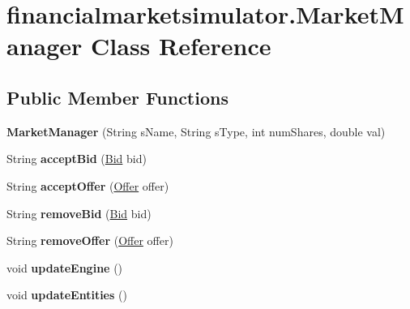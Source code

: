 \hypertarget{classfinancialmarketsimulator_1_1_market_manager}{\section{financialmarketsimulator.\+Market\+Manager Class Reference}
\label{classfinancialmarketsimulator_1_1_market_manager}
}
\subsection*{Public Member Functions}
\begin{DoxyCompactItemize}
\item 
\hypertarget{classfinancialmarketsimulator_1_1_market_manager_abec3bfc62ba95bd12c444492b7cad61e}{{\bfseries Market\+Manager} (String s\+Name, String s\+Type, int num\+Shares, double val)}\label{classfinancialmarketsimulator_1_1_market_manager_abec3bfc62ba95bd12c444492b7cad61e}

\item 
\hypertarget{classfinancialmarketsimulator_1_1_market_manager_a468b11be3b1e2ce72f93dfc25468273b}{String {\bfseries accept\+Bid} (\hyperlink{classfinancialmarketsimulator_1_1_bid}{Bid} bid)}\label{classfinancialmarketsimulator_1_1_market_manager_a468b11be3b1e2ce72f93dfc25468273b}

\item 
\hypertarget{classfinancialmarketsimulator_1_1_market_manager_a2f9ad41c35ca0bb1ad2ac045f8cd3dd3}{String {\bfseries accept\+Offer} (\hyperlink{classfinancialmarketsimulator_1_1_offer}{Offer} offer)}\label{classfinancialmarketsimulator_1_1_market_manager_a2f9ad41c35ca0bb1ad2ac045f8cd3dd3}

\item 
\hypertarget{classfinancialmarketsimulator_1_1_market_manager_aa8c0454b1d66599ff5abbb01d35790e8}{String {\bfseries remove\+Bid} (\hyperlink{classfinancialmarketsimulator_1_1_bid}{Bid} bid)}\label{classfinancialmarketsimulator_1_1_market_manager_aa8c0454b1d66599ff5abbb01d35790e8}

\item 
\hypertarget{classfinancialmarketsimulator_1_1_market_manager_ad49a43c96b962562014c7bb37dfa5f7e}{String {\bfseries remove\+Offer} (\hyperlink{classfinancialmarketsimulator_1_1_offer}{Offer} offer)}\label{classfinancialmarketsimulator_1_1_market_manager_ad49a43c96b962562014c7bb37dfa5f7e}

\item 
\hypertarget{classfinancialmarketsimulator_1_1_market_manager_afb2bf557ed70cd23feccddfb5c01ab0d}{void {\bfseries update\+Engine} ()}\label{classfinancialmarketsimulator_1_1_market_manager_afb2bf557ed70cd23feccddfb5c01ab0d}

\item 
\hypertarget{classfinancialmarketsimulator_1_1_market_manager_a32d674b201543e3a6783ec64ba172266}{void {\bfseries update\+Entities} ()}\label{classfinancialmarketsimulator_1_1_market_manager_a32d674b201543e3a6783ec64ba172266}

\end{DoxyCompactItemize}



